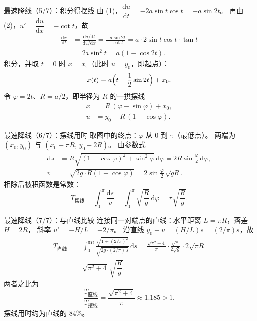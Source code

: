 \documentclass[fontset=windows, chinese, 10pt, xcolor=dvipsnames]{beamer}
\begin{document}
\begin{frame}{最速降线（5/7）：积分得摆线}
  由 (1)，$\dfrac{\mathrm{d}u}{\mathrm{d}t}=-2a\sin t\cos t=-a\sin 2t$。
  再由 (2)，$u'=\dfrac{\mathrm{d}u}{\mathrm{d}x}=-\cot t$，故
  \begin{align*}
    \frac{\mathrm{d}x}{\mathrm{d}t}
    &=\frac{\mathrm{d}u/\mathrm{d}t}{\mathrm{d}u/\mathrm{d}x}
      =\frac{-a\sin 2t}{-\cot t}
      =a\cdot 2\sin t\cos t\cdot\tan t \\
    &=2a\sin^2 t
      =a(1-\cos 2t).
  \end{align*}
  积分，并取 $t=0$ 时 $x=x_0$（此时 $u=y_0$，即起点）：
  \begin{equation*}
    x(t)=a\Bigl(t-\frac12\sin 2t\Bigr)+x_0.
  \end{equation*}
  令 $\varphi=2t$、$R=a/2$，即半径为 $R$ 的一拱摆线
  \begin{equation*}
    \boxed{
      \begin{aligned}
        x &= R\,(\varphi-\sin\varphi)+x_0, \\
        u &= y_0-R\,(1-\cos\varphi).
      \end{aligned}
    }
  \end{equation*}
\end{frame}

\begin{frame}{最速降线（6/7）：摆线用时}
  取图中的终点：$\varphi$ 从 $0$ 到 $\pi$（最低点）。
  两端为 $(x_0,y_0)$ 与 $(x_0+\pi R,\,y_0-2R)$。
  由参数式
  \begin{align*}
    \mathrm{d}s
    &= R\sqrt{(1-\cos\varphi)^2+\sin^2\varphi}\,\mathrm{d}\varphi
     = 2R\sin\frac{\varphi}{2}\,\mathrm{d}\varphi, \\
    v
    &= \sqrt{2g\cdot R(1-\cos\varphi)}
     = 2\sin\frac{\varphi}{2}\,\sqrt{gR}.
  \end{align*}
  相除后被积函数是常数：
  \begin{equation*}
    T_{\text{摆线}}
    =\int_0^{\pi}\frac{\mathrm{d}s}{v}
    =\int_0^{\pi}\sqrt{\frac{R}{g}}\,\mathrm{d}\varphi
    =\boxed{\pi\sqrt{\dfrac{R}{g}}}.
  \end{equation*}
\end{frame}

\begin{frame}{最速降线（7/7）：与直线比较}
  连接同一对端点的直线：水平距离 $L=\pi R$，落差 $H=2R$，
  斜率 $u'=-H/L=-2/\pi$。
  沿直线 $y_0-u=(H/L)s=(2/\pi)s$，故
  \begin{align*}
    T_{\text{直线}}
    &=\int_0^{\pi R}
      \frac{\sqrt{1+(2/\pi)^2}}{\sqrt{2g\cdot(2/\pi)\,s}}\,\mathrm{d}s
    =\frac{\sqrt{\pi^2+4}}{\pi}\cdot
      \frac{\sqrt{\pi}}{2\sqrt{g}}\cdot
      2\sqrt{\pi R} \\
    &=\boxed{\sqrt{\pi^2+4}\,\sqrt{\dfrac{R}{g}}}.
  \end{align*}
  两者之比为
  \begin{equation*}
    \frac{T_{\text{直线}}}{T_{\text{摆线}}}
    =\frac{\sqrt{\pi^2+4}}{\pi}\approx 1.185>1.
  \end{equation*}
  摆线用时约为直线的 $84\%$。
\end{frame}
\end{document}
